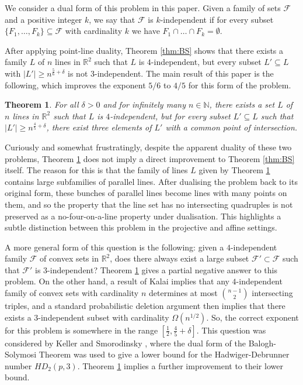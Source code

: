 \documentclass[11pt]{amsart}
\newcommand{\cF}{\mathcal{F}}
\newtheorem{theorem}{Theorem}
\theoremstyle{remark}
\begin{document}
We consider a dual form of this problem in this paper. Given a family of sets $\cF$ and a positive integer $k$, we say that $\mathcal F$ is $k$-independent if for every subset $\{F_1,\dots,F_k\} \subseteq \cF$ with cardinality $k$ we have $F_1\cap  \dots \cap F_k= \emptyset$.

After applying point-line duality, Theorem \ref{thm:BS} shows that there exists a family $L$ of $n$ lines in $\mathbb R^2$ such that $L$ is $4$-independent, but every subset $L' \subseteq L $ with $|L'| \geq n^{\frac{5}{6}+\delta} $ is not $3$-independent. The main result of this paper is the following, which improves the exponent $5/6$ to $4/5$ for this form of the problem.

\begin{theorem} \label{thm:BSlines}
    For all $\delta>0$ and for infinitely many $n \in \mathbb N$, there exists a set $L$ of $n$ lines in $\mathbb R^2$ such that $L$ is $4$-independent, but for every subset $L' \subseteq L$ such that $|L'| \geq n^{\frac{4}{5}+\delta}$, there exist three elements of $L'$ with a common point of intersection.
\end{theorem}

Curiously and somewhat frustratingly, despite the apparent duality of these two problems, Theorem \ref{thm:BSlines} does not imply a direct improvement to Theorem \ref{thm:BS} itself. The reason for this is that the family of lines $L$ given by Theorem \ref{thm:BSlines} contains large subfamilies of parallel lines. After dualising the problem back to its original form, these bunches of parallel lines become lines with many points on them, and so the property that the line set has no intersecting quadruples is not preserved as a no-four-on-a-line property under dualisation. This highlights a subtle distinction between this problem in the projective and affine settings.

A more general form of this question is the following: given a $4$-independent family $\cF$ of convex sets in $\mathbb R^2$, does there always exist a large subset $\cF' \subset \cF$ such that $\cF'$ is $3$-independent?  Theorem \ref{thm:BSlines} gives a partial negative answer to this problem. On the other hand, a result of Kalai \cite{Ka} implies that any $4$-independent family of convex sets with cardinality $n$ determines at most $\binom{n-1}{2}$ intersecting triples, and a standard probabilistic deletion argument then implies that there exists a $3$-independent subset with cardinality $\Omega(n^{1/2})$. So, the correct exponent for this problem is somewhere in the range $[\frac{1}{2},\frac{4}{5}+\delta]$. This question was considered by Keller and Smorodinsky \cite{KeSm}, where the dual form of the Balogh-Solymosi Theorem was used to give a lower bound for the Hadwiger-Debrunner number $HD_2(p,3)$. Theorem \ref{thm:BSlines} implies a further improvement to their lower bound.
\end{document}
